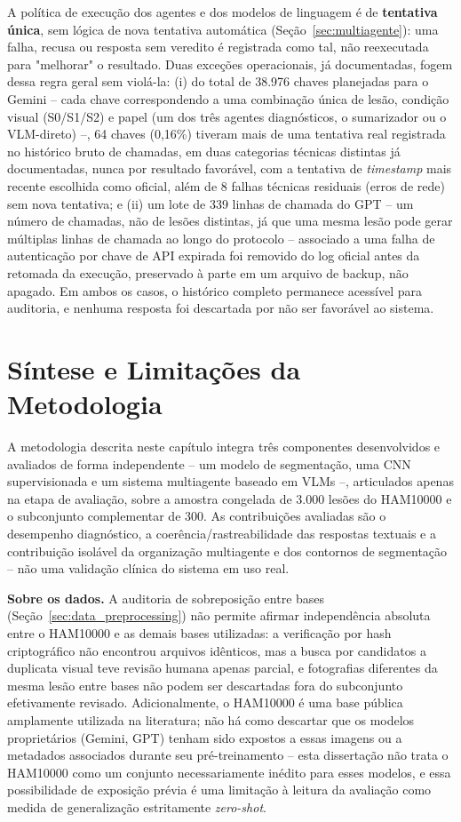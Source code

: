 A política de execução dos agentes e dos modelos de linguagem é de \textbf{tentativa única}, sem lógica de nova tentativa automática (Seção~\ref{sec:multiagente}): uma falha, recusa ou resposta sem veredito é registrada como tal, não reexecutada para "melhorar" o resultado. Duas exceções operacionais, já documentadas, fogem dessa regra geral sem violá-la: (i) do total de 38.976 chaves planejadas para o Gemini -- cada chave correspondendo a uma combinação única de lesão, condição visual (S0/S1/S2) e papel (um dos três agentes diagnósticos, o sumarizador ou o VLM-direto) --, 64 chaves (0,16\%) tiveram mais de uma tentativa real registrada no histórico bruto de chamadas, em duas categorias técnicas distintas já documentadas, nunca por resultado favorável, com a tentativa de \textit{timestamp} mais recente escolhida como oficial, além de 8 falhas técnicas residuais (erros de rede) sem nova tentativa; e (ii) um lote de 339 linhas de chamada do GPT -- um número de chamadas, não de lesões distintas, já que uma mesma lesão pode gerar múltiplas linhas de chamada ao longo do protocolo -- associado a uma falha de autenticação por chave de API expirada foi removido do log oficial antes da retomada da execução, preservado à parte em um arquivo de backup, não apagado. Em ambos os casos, o histórico completo permanece acessível para auditoria, e nenhuma resposta foi descartada por não ser favorável ao sistema.

\section{Síntese e Limitações da Metodologia}

A metodologia descrita neste capítulo integra três componentes desenvolvidos e avaliados de forma independente -- um modelo de segmentação, uma CNN supervisionada e um sistema multiagente baseado em VLMs --, articulados apenas na etapa de avaliação, sobre a amostra congelada de 3.000 lesões do HAM10000 e o subconjunto complementar de 300. As contribuições avaliadas são o desempenho diagnóstico, a coerência/rastreabilidade das respostas textuais e a contribuição isolável da organização multiagente e dos contornos de segmentação -- não uma validação clínica do sistema em uso real.

\textbf{Sobre os dados.} A auditoria de sobreposição entre bases (Seção~\ref{sec:data_preprocessing}) não permite afirmar independência absoluta entre o HAM10000 e as demais bases utilizadas: a verificação por hash criptográfico não encontrou arquivos idênticos, mas a busca por candidatos a duplicata visual teve revisão humana apenas parcial, e fotografias diferentes da mesma lesão entre bases não podem ser descartadas fora do subconjunto efetivamente revisado. Adicionalmente, o HAM10000 é uma base pública amplamente utilizada na literatura; não há como descartar que os modelos proprietários (Gemini, GPT) tenham sido expostos a essas imagens ou a metadados associados durante seu pré-treinamento -- esta dissertação não trata o HAM10000 como um conjunto necessariamente inédito para esses modelos, e essa possibilidade de exposição prévia é uma limitação à leitura da avaliação como medida de generalização estritamente \textit{zero-shot}.

